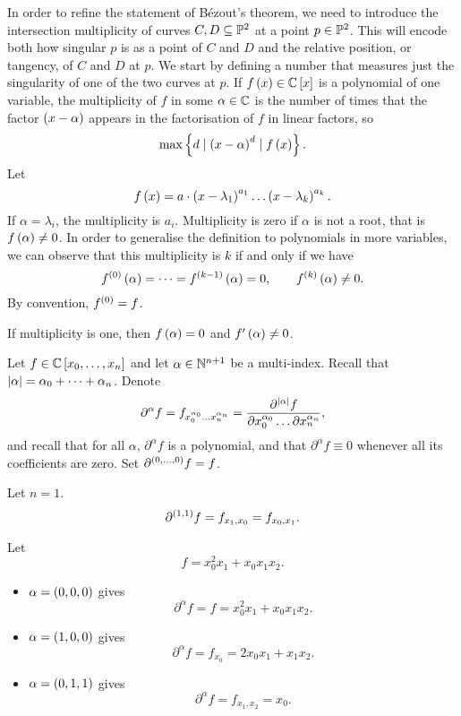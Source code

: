 In order to refine the statement of B\'ezout's theorem, we need to introduce the intersection multiplicity of curves $ C, D \subseteq \P^2 $ at a point $ p \in \P^2 $. This will encode both how singular $ p $ is as a point of $ C $ and $ D $ and the relative position, or tangency, of $ C $ and $ D $ at $ p $. We start by defining a number that measures just the singularity of one of the two curves at $ p $. If $ f\rb{x} \in \C\sb{x} $ is a polynomial of one variable, the multiplicity of $ f $ in some $ \alpha \in \C $ is the number of times that the factor $ \rb{x - \alpha} $ appears in the factorisation of $ f $ in linear factors, so
$$ \max\cb{d \mid \rb{x - \alpha}^d \mid f\rb{x}}. $$
Let
$$ f\rb{x} = a \cdot \rb{x - \lambda_1}^{a_1} \dots \rb{x - \lambda_k}^{a_k}. $$
If $ \alpha = \lambda_i $, the multiplicity is $ a_i $. Multiplicity is zero if $ \alpha $ is not a root, that is $ f\rb{\alpha} \ne 0 $. In order to generalise the definition to polynomials in more variables, we can observe that this multiplicity is $ k $ if and only if we have
$$ f^{\rb{0}}\rb{\alpha} = \dots = f^{\rb{k - 1}}\rb{\alpha} = 0, \qquad f^{\rb{k}}\rb{\alpha} \ne 0. $$
By convention, $ f^{\rb{0}} = f $.

\begin{example*}
If multiplicity is one, then $ f\rb{\alpha} = 0 $ and $ f'\rb{\alpha} \ne 0 $.
\end{example*}

\begin{notation}
Let $ f \in \C\sb{x_0, \dots, x_n} $ and let $ \alpha \in \N^{n + 1} $ be a multi-index. Recall that $ \abs{\alpha} = \alpha_0 + \dots + \alpha_n $. Denote
$$ \partial^\alpha f = f_{x_0^{\alpha_0} \dots x_n^{\alpha_n}} = \dfrac{\partial^{\abs{\alpha}} f}{\partial x_0^{\alpha_0} \dots \partial x_n^{\alpha_n}}, $$
and recall that for all $ \alpha $, $ \partial^\alpha f $ is a polynomial, and that $ \partial^\alpha f \equiv 0 $ whenever all its coefficients are zero. Set $ \partial^{\rb{0, \dots, 0}} f = f $.
\end{notation}

\begin{example*}
Let $ n = 1 $.
$$ \partial^{\rb{1, 1}} f = f_{x_1, x_0} = f_{x_0, x_1}. $$
\end{example*}

\begin{example*}
Let
$$ f = x_0^2x_1 + x_0x_1x_2. $$
\begin{itemize}
\item $ \alpha = \rb{0, 0, 0} $ gives
$$ \partial^\alpha f = f = x_0^2x_1 + x_0x_1x_2. $$
\item $ \alpha = \rb{1, 0, 0} $ gives
$$ \partial^\alpha f = f_{x_0} = 2x_0x_1 + x_1x_2. $$
\item $ \alpha = \rb{0, 1, 1} $ gives
$$ \partial^\alpha f = f_{x_1, x_2} = x_0. $$
\end{itemize}
\end{example*}


